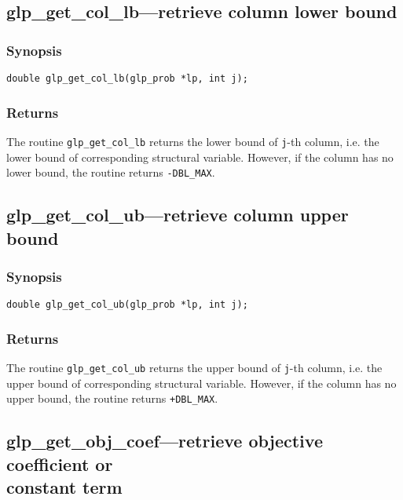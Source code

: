 \subsection{glp\_get\_col\_lb---retrieve column lower bound}

\subsubsection*{Synopsis}

\begin{verbatim}
double glp_get_col_lb(glp_prob *lp, int j);
\end{verbatim}

\subsubsection*{Returns}

The routine \verb|glp_get_col_lb| returns the lower bound of
\verb|j|-th column, i.e. the lower bound of corresponding structural
variable. However, if the column has no lower bound, the routine returns
\verb|-DBL_MAX|.

\subsection{glp\_get\_col\_ub---retrieve column upper bound}

\subsubsection*{Synopsis}

\begin{verbatim}
double glp_get_col_ub(glp_prob *lp, int j);
\end{verbatim}

\subsubsection*{Returns}

The routine \verb|glp_get_col_ub| returns the upper bound of
\verb|j|-th column, i.e. the upper bound of corresponding structural
variable. However, if the column has no upper bound, the routine returns
\verb|+DBL_MAX|.

\subsection{glp\_get\_obj\_coef---retrieve objective coefficient or\\
constant term}

